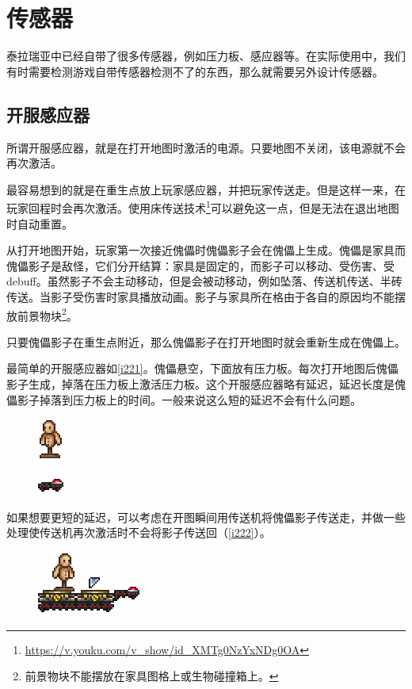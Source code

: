 \section{传感器}
泰拉瑞亚中已经自带了很多传感器，例如压力板、感应器等。在实际使用中，我们有时需要检测游戏自带传感器检测不了的东西，那么就需要另外设计传感器。

\subsection{开服感应器}
所谓开服感应器，就是在打开地图时激活的电源。只要地图不关闭，该电源就不会再次激活。

最容易想到的就是在重生点放上玩家感应器，并把玩家传送走。但是这样一来，在玩家回程时会再次激活。使用床传送技术\footnote{\url{https://v.youku.com/v_show/id_XMTg0NzYxNDg0OA}}可以避免这一点，但是无法在退出地图时自动重置。

从打开地图开始，玩家第一次接近傀儡时傀儡影子会在傀儡上生成。傀儡是家具而傀儡影子是敌怪，它们分开结算：家具是固定的，而影子可以移动、受伤害、受debuff。虽然影子不会主动移动，但是会被动移动，例如坠落、传送机传送、半砖传送。当影子受伤害时家具播放动画。影子与家具所在格由于各自的原因均不能摆放前景物块\footnote{前景物块不能摆放在家具图格上或生物碰撞箱上。}。

只要傀儡影子在重生点附近，那么傀儡影子在打开地图时就会重新生成在傀儡上。

最简单的开服感应器如\autoref{i221}。傀儡悬空，下面放有压力板。每次打开地图后傀儡影子生成，掉落在压力板上激活压力板。这个开服感应器略有延迟，延迟长度是傀儡影子掉落到压力板上的时间。一般来说这么短的延迟不会有什么问题。

\begin{figure}[!ht]
\centering
\includegraphics{images/221.png}
\caption{}
\label{i221}
\end{figure}

如果想要更短的延迟，可以考虑在开图瞬间用传送机将傀儡影子传送走，并做一些处理使传送机再次激活时不会将影子传送回（\autoref{i222}）。

\begin{figure}[!ht]
\centering
\includegraphics{images/222.png}
\caption{}
\label{i222}
\end{figure}

